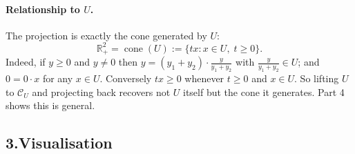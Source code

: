 \documentclass[11pt]{article}
\DeclareMathOperator{\cone}{cone}
\theoremstyle{definition}
\theoremstyle{plain}
\begin{document}
\paragraph{Relationship to $U$.} The projection is exactly the cone
generated by $U$:
\[
  \mathbb{R}^2_+ = \cone(U) := \{ t x : x \in U,\; t \ge 0 \}.
\]
Indeed, if $y \ge 0$ and $y \ne 0$ then
$y = (y_1+y_2) \cdot \frac{y}{y_1+y_2}$ with
$\frac{y}{y_1+y_2} \in U$; and $0 = 0 \cdot x$ for any $x \in U$.
Conversely $tx \ge 0$ whenever $t \ge 0$ and $x \in U$. So lifting $U$
to $\mathcal{C}_U$ and projecting back recovers not $U$ itself but the
cone it generates. Part 4 shows this is general.

\subsection*{3.\quad Visualisation}
\end{document}
